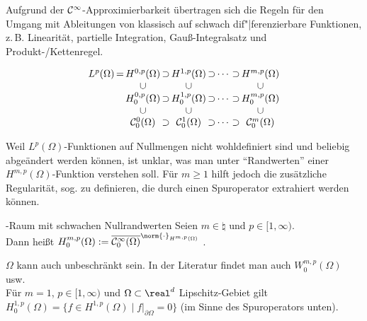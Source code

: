 \begin{Bem}
    Aufgrund der $\mathcal{C}^\infty$-Approximierbarkeit übertragen sich die Regeln für den
    Umgang mit Ableitungen von klassisch auf schwach dif"|ferenzierbare Funktionen,
    z.\,B. Linearität, partielle Integration, Gauß-Integralsatz und Produkt-/Kettenregel.
\end{Bem}

\linie

\begin{floatingfigure}[r]{71mm}
    \vspace{-8mm}
    \footnotesize
    \begin{gather*}
        \setlength{\arraycolsep}{0.3mm}
        \begin{array}{ccccccccc}
            L^p(\Omega)&=&H^{0,p}(\Omega)&\supset&H^{1,p}(\Omega)&
            \supset&\dotsb&\supset&H^{m,p}(\Omega)\\
            &&\cup&&\cup&&&&\cup\\
            &&H^{0,p}_0(\Omega)&\supset&H^{1,p}_0(\Omega)&
            \supset&\dotsb&\supset&H^{m,p}_0(\Omega)\\
            &&\cup&&\cup&&&&\cup\\
            &&\C^0_0(\Omega)&\supset&\C^1_0(\Omega)&
            \supset&\dotsb&\supset&\C^m_0(\Omega)
        \end{array}
    \end{gather*}
\end{floatingfigure}
\begin{Bem}
    Weil $L^p(\Omega)$-Funktionen auf Nullmengen nicht wohldefiniert sind und
    beliebig abgeändert werden können, ist unklar, was man unter "`Randwerten"' einer
    $H^{m,p}(\Omega)$-Funktion verstehen soll.
    Für $m \ge 1$ hilft jedoch die zusätzliche Regularität, sog. 
    zu definieren, die durch einen Spuroperator extrahiert werden können.
\end{Bem}

\begin{Def}{-Raum mit schwachen Nullrandwerten}
    Seien $m \in \natural$ und $p \in [1, \infty)$.\\
    Dann heißt $H^{m,p}_0(\Omega) :=
    \overline{\C^\infty_0(\Omega)}^{\norm{\cdot}_{H^{m,p}(\Omega)}}$
    .
\end{Def}

\begin{Bem}
    $\Omega$ kann auch unbeschränkt sein.
    In der Literatur findet man auch $W^{m,p}_0(\Omega)$ usw.\\
    Für $m = 1$, $p \in [1, \infty)$ und $\Omega \subset \real^d$ Lipschitz-Gebiet
    gilt $H^{1,p}_0(\Omega) = \{f \in H^{1,p}(\Omega) \;|\; f|_{\partial\Omega} = 0\}$
    (im Sinne des Spuroperators unten).
\end{Bem}

